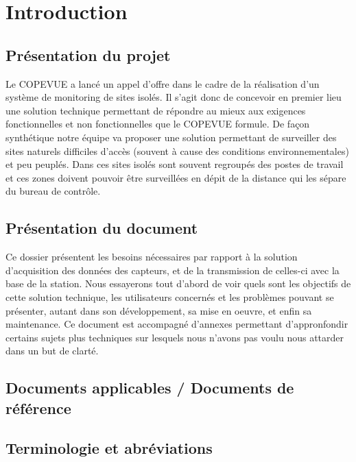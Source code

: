 \section{Introduction}

\subsection{Présentation du projet}
Le COPEVUE a lancé un appel d'offre dans le cadre de la réalisation d'un système de monitoring de sites isolés. Il s'agit donc de concevoir en premier lieu une solution technique permettant de répondre au mieux aux exigences fonctionnelles et non fonctionnelles que le COPEVUE formule. De façon synthétique notre équipe va proposer une solution permettant de surveiller des sites naturels difficiles d'accès (souvent à cause des conditions environnementales) et peu peuplés. Dans ces sites isolés sont souvent regroupés des postes de travail et ces zones doivent pouvoir être surveillées en dépit de la distance qui les sépare du bureau de contrôle.

\subsection{Présentation du document}

Ce dossier présentent les besoins nécessaires par rapport à la solution d'acquisition des données des capteurs, et de la transmission de celles-ci avec la base de la station. Nous essayerons tout d'abord de voir quels sont les objectifs de cette solution technique, les utilisateurs concernés et les problèmes pouvant se présenter, autant dans son développement, sa mise en oeuvre, et enfin sa maintenance. Ce document est accompagné d'annexes permettant d'appronfondir certains sujets plus techniques sur lesquels nous n'avons pas voulu nous attarder dans un but de clarté.

\subsection{Documents applicables / Documents de référence}


\subsection{Terminologie et abréviations}

